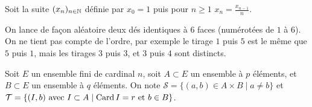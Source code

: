 \begin{question}
Soit la suite $(x_n)_{n\in \mathbb{N}}$ définie par $x_0=1$ puis pour
$n \ge 1$ $x_n=\frac {x_{n-1}}{n}$.
\begin{answers}




\end{answers}
\end{question}


\begin{question}
On lance de façon aléatoire deux dés identiques à $6$
faces (numérotées de $1$ à $6$). On ne tient pas compte de
l'ordre, par exemple le tirage $1$ puis $5$ est le même que $5$
puis $1$, mais les tirages $3$ puis $3$, et $3$ puis $4$ sont
distincts.
\begin{answers}




\end{answers}
\end{question}


\begin{question}
Soit $E$ un ensemble fini de cardinal $n$, soit $A\subset E$ un
ensemble à $p$ éléments, et  $B \subset E$ un ensemble à
$q$ éléments. On note $\mathcal{S} = \{ (a,b) \in A \times B \mid a\neq b \}$ et
 $\mathcal{T} = \{ (I,b) \text{ avec } I\subset A \mid \mathop{\text{Card}} I =r \text{ et } b\in B \}$.
\begin{answers}




\end{answers}
\end{question}



